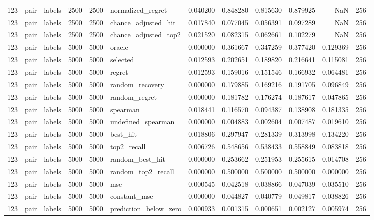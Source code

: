 \begin{tabular}{rllrrlrrrrrr}
123 & pair & labels & 2500 & 2500 & normalized_regret & 0.040200 & 0.848280 & 0.815630 & 0.879925 & NaN & 256 \\
123 & pair & labels & 2500 & 2500 & chance_adjusted_hit & 0.017840 & 0.077045 & 0.056391 & 0.097289 & NaN & 256 \\
123 & pair & labels & 2500 & 2500 & chance_adjusted_top2 & 0.021520 & 0.082315 & 0.062661 & 0.102279 & NaN & 256 \\
123 & pair & labels & 5000 & 5000 & oracle & 0.000000 & 0.361667 & 0.347259 & 0.377420 & 0.129369 & 256 \\
123 & pair & labels & 5000 & 5000 & selected & 0.012593 & 0.202651 & 0.189820 & 0.216641 & 0.115081 & 256 \\
123 & pair & labels & 5000 & 5000 & regret & 0.012593 & 0.159016 & 0.151546 & 0.166932 & 0.064481 & 256 \\
123 & pair & labels & 5000 & 5000 & random_recovery & 0.000000 & 0.179885 & 0.169216 & 0.191705 & 0.096849 & 256 \\
123 & pair & labels & 5000 & 5000 & random_regret & 0.000000 & 0.181782 & 0.176274 & 0.187617 & 0.047865 & 256 \\
123 & pair & labels & 5000 & 5000 & spearman & 0.018441 & 0.116570 & 0.094387 & 0.138908 & 0.181335 & 256 \\
123 & pair & labels & 5000 & 5000 & undefined_spearman & 0.000000 & 0.004883 & 0.002604 & 0.007487 & 0.019610 & 256 \\
123 & pair & labels & 5000 & 5000 & best_hit & 0.018806 & 0.297947 & 0.281339 & 0.313998 & 0.134220 & 256 \\
123 & pair & labels & 5000 & 5000 & top2_recall & 0.006726 & 0.548656 & 0.538433 & 0.558849 & 0.083818 & 256 \\
123 & pair & labels & 5000 & 5000 & random_best_hit & 0.000000 & 0.253662 & 0.251953 & 0.255615 & 0.014708 & 256 \\
123 & pair & labels & 5000 & 5000 & random_top2_recall & 0.000000 & 0.500000 & 0.500000 & 0.500000 & 0.000000 & 256 \\
123 & pair & labels & 5000 & 5000 & mse & 0.000545 & 0.042518 & 0.038866 & 0.047039 & 0.035510 & 256 \\
123 & pair & labels & 5000 & 5000 & constant_mse & 0.000000 & 0.044827 & 0.040779 & 0.049817 & 0.038826 & 256 \\
123 & pair & labels & 5000 & 5000 & prediction_below_zero & 0.000933 & 0.001315 & 0.000651 & 0.002127 & 0.005974 & 256 \\

\end{tabular}
